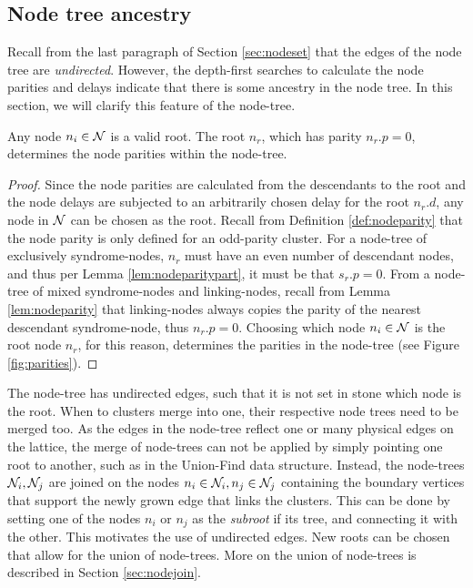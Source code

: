 
\subsection{Node tree ancestry}
Recall from the last paragraph of Section \ref{sec:nodeset} that the edges of the node tree are \emph{undirected}. However, the depth-first searches to calculate the node parities and delays indicate that there is some ancestry in the node tree. In this section, we will clarify this feature of the node-tree. 
\begin{lemma}\label{lem:anynoderoot}
  Any node $n_i \in \mathcal{N}$ is a valid root. The root $n_r$, which has parity $n_r.p=0$, determines the node parities within the node-tree. 
\end{lemma}
\begin{proof}
  Since the node parities are calculated from the descendants to the root and the node delays are subjected to an arbitrarily chosen delay for the root $n_r.d$, any node in $\mathcal{N}$ can be chosen as the root. Recall from Definition \ref{def:nodeparity} that the node parity is only defined for an odd-parity cluster. For a node-tree of exclusively syndrome-nodes, $n_r$ must have an even number of descendant nodes, and thus per Lemma \ref{lem:nodeparitypart}, it must be that $s_r.p=0$. From a node-tree of mixed syndrome-nodes and linking-nodes, recall from Lemma \ref{lem:nodeparity} that linking-nodes always copies the parity of the nearest descendant syndrome-node, thus $n_r.p=0$. Choosing which node $n_i \in \mathcal{N}$ is the root node $n_r$, for this reason, determines the parities in the node-tree (see Figure \ref{fig:parities}). 
\end{proof}

The node-tree has undirected edges, such that it is not set in stone which node is the root. When to clusters merge into one, their respective node trees need to be merged too. As the edges in the node-tree reflect one or many physical edges on the lattice, the merge of node-trees can not be applied by simply pointing one root to another, such as in the Union-Find data structure. Instead, the node-trees $\mathcal{N}_i, \mathcal{N}_j$ are joined on the nodes $n_i \in \mathcal{N}_i, n_j\in \mathcal{N}_j$ containing the boundary vertices that support the newly grown edge that links the clusters. This can be done by setting one of the nodes $n_i$ or $n_j$ as the \emph{subroot} if its tree, and connecting it with the other. This motivates the use of undirected edges. New roots can be chosen that allow for the union of node-trees. More on the union of node-trees is described in Section \ref{sec:nodejoin}. 

